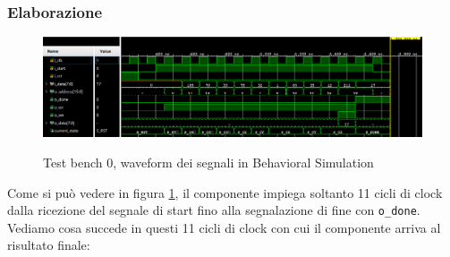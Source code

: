 \documentclass{article}
\begin{document}
\subsubsection{Elaborazione}
\begin{figure}[H]
    \centering
    \caption{Test bench 0, waveform dei segnali in Behavioral Simulation}
    \includegraphics[width=1.0\textwidth]{images/test-bench-0.png}
    \label{fig:test-bench-0}
\end{figure}
Come si può vedere in figura \ref{fig:test-bench-0}, il componente impiega soltanto 11 cicli di clock dalla ricezione del segnale di start fino alla segnalazione di fine con \verb^o_done^.\\
Vediamo cosa succede in questi 11 cicli di clock con cui il componente arriva al risultato finale:
\renewcommand{\labelenumi}{\Roman{enumi}}
\end{document}
